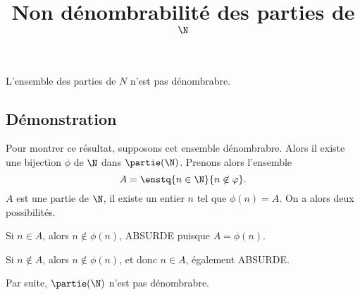 \documentclass[fontsize=12pt,twoside=false,parskip=half]{scrartcl}
\title{Non dénombrabilité des parties de $\N$}
\date{}
\author{}
\begin{document}
\maketitle
   \begin{Theoreme}
      L’ensemble des parties de $N$ n’est pas dénombrabre.
   \end{Theoreme}
   \subsection{Démonstration}
      Pour montrer ce résultat, supposons cet ensemble dénombrabre. Alors il existe une bijection
      $\phi$ de $\N$ dans $\partie(\N)$. Prenons alors l’ensemble
      \[
         A = \enstq{n \in \N}{n \not \in \varphi}.
      \]      
      $A$ est une partie de $\N$, il existe un entier $n$ tel que $\phi(n) = A$. On a alors deux possibilités.
      \begin{description}
         \item Si $n \in A$, alors $n \not \in \phi(n)$, ABSURDE puisque $A = \phi(n)$.
         \item Si $n \not \in A$, alors $n \not \in \phi(n)$, et donc $n \in A$, également ABSURDE.
      \end{description}
      Par suite, $\partie(\N)$ n’est pas dénombrabre.
\end{document}
